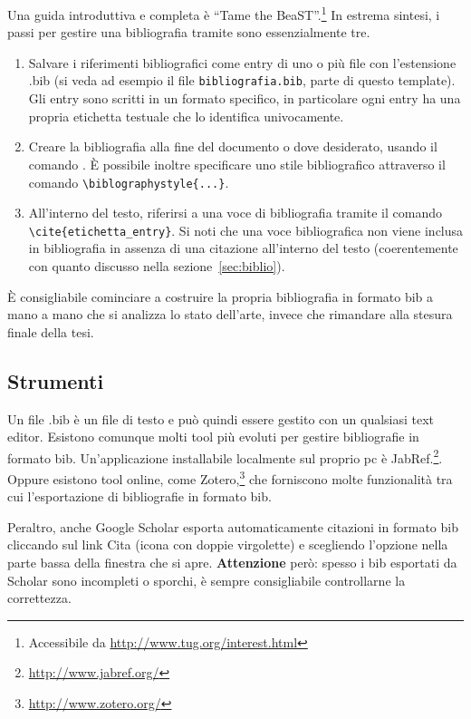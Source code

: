 \documentclass[12pt]{report}
\begin{document}
Una guida introduttiva e completa \`e ``Tame the BeaST''.\footnote{Accessibile da \url{http://www.tug.org/interest.html}} 
In estrema sintesi, i passi per gestire una bibliografia tramite  sono essenzialmente tre.
\begin{enumerate}
\item Salvare i riferimenti bibliografici come entry di uno o pi\`u file con l'estensione .bib (si veda ad esempio il file \texttt{bibliografia.bib}, parte di questo template). Gli entry sono scritti in un formato specifico, in particolare ogni entry ha una propria etichetta testuale che lo identifica univocamente.
\item Creare la bibliografia alla fine del documento o dove desiderato, usando il comando \verb||. \`E possibile inoltre specificare uno stile bibliografico attraverso il comando \verb|\biblographystyle{...}|.
\item All'interno del testo, riferirsi a una voce di bibliografia tramite il comando \verb|\cite{etichetta_entry}|. Si noti che una voce bibliografica non viene inclusa in bibliografia in assenza di una citazione all'interno del testo (coerentemente con quanto discusso nella sezione~\ref{sec:biblio}).
\end{enumerate}

\`E consigliabile cominciare a costruire la propria bibliografia in formato bib a mano a mano che si analizza lo stato dell'arte, invece che rimandare alla stesura finale della tesi.

\subsection{Strumenti}

Un file .bib \`e un file di testo e pu\`o quindi essere gestito con un qualsiasi text editor. Esistono comunque molti tool pi\`u evoluti per gestire bibliografie in formato bib. Un'applicazione installabile localmente sul proprio pc \`e JabRef.\footnote{\url{http://www.jabref.org/}}. Oppure esistono tool online, come Zotero,\footnote{\url{http://www.zotero.org/}} che forniscono molte funzionalità tra cui l'esportazione di bibliografie in formato bib.

Peraltro, anche Google Scholar esporta automaticamente citazioni in formato bib cliccando sul link Cita (icona con doppie virgolette) e scegliendo l'opzione  nella parte bassa della finestra che si apre. \textbf{Attenzione} per\`o: spesso i bib esportati da Scholar sono incompleti o sporchi, \`e sempre consigliabile controllarne la correttezza.
\end{document}
